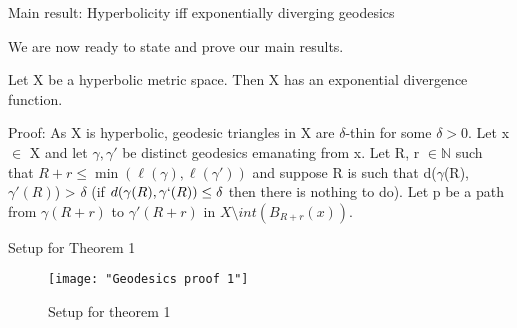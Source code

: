 \documentclass[11pt]{beamer}
\newcommand{\vs}{\vskip10pt}
\begin{document}
	\begin{frame}{Main result: Hyperbolicity iff exponentially diverging geodesics}
		
		We are now ready to state and prove our main results.
		
		\begin{theorem}
			
			Let X be a hyperbolic metric space. Then X has an exponential divergence function.
			
		\end{theorem}
	\vs
	Proof:
	\vs
	As X is hyperbolic, geodesic triangles in X are $\delta $-thin for some $\delta > 0$. 
	\vskip5pt
	Let x $\in $ X and let $\gamma, \gamma'$ be distinct geodesics emanating from x. Let R, r $\in \mathbb{N}$ such that $R+r \leq \min(\ell(\gamma), \ell(\gamma'))$ and suppose R is such that d($\gamma$(R), $\gamma'(R)$) > $\delta$ (if $d(\gamma(R), \gamma`(R)) \leq \delta$ then there is nothing to do). 
	\vskip5pt
	Let p be a path from $\gamma(R+r)$ to $\gamma'(R+r)$ in $X \setminus int(B_{R+r}(x))$. 
	\vskip5pt
		
	\end{frame}
	
	\begin{frame}{Setup for Theorem 1}
		
\begin{figure}
	\centering
	\texttt{[image: "Geodesics proof 1"]}
	\caption{Setup for theorem 1}
	\label{fig:geodesics-proof-1}
\end{figure}
		
	\end{frame}
	
\end{document}

